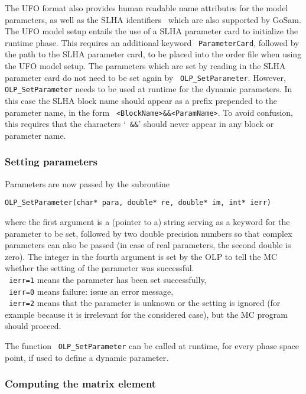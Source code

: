 The UFO  format also provides human readable name attributes for the 
model parameters, as well as the 
SLHA identifiers~\cite{Skands:2003cj} which are also supported by GoSam.
The UFO model setup entails the use of a SLHA parameter card to initialize the runtime phase.
This requires an additional keyword \texttt{ ParameterCard}, followed by the path to the SLHA parameter card,
to be placed into the order file when using the UFO model setup. 
The parameters which are set by reading in the SLHA parameter card do not need to be set 
again by \texttt{ OLP\_SetParameter}. However, \texttt{ OLP\_SetParameter} needs to be used at 
runtime for the dynamic parameters. 
In this case the SLHA block name should appear as a prefix prepended to the parameter name, 
in the form  
\texttt{ <BlockName>\&\&<ParamName>}.
To avoid confusion, this requires that the characters `\texttt{ \&\&}' should never appear in 
any block or parameter name.

\subsubsection{Setting parameters}
Parameters are now passed by the subroutine 
\begin{lstlisting}[style=C]
      OLP_SetParameter(char* para, double* re, double* im, int* ierr)
\end{lstlisting}

where the first argument is a (pointer to a) string serving as a keyword 
for the parameter to be set, followed by two double precision numbers
so that complex parameters can also be passed (in case of real parameters, 
the second double is zero). The integer in the fourth argument 
is set by the OLP to tell the MC whether the setting of the parameter 
was successful.\\
\texttt{ ierr=1} means the parameter has been set successfully, \\
\texttt{ ierr=0} means failure: issue an error message, \\
\texttt{ ierr=2} means that the parameter is unknown 
or the setting is ignored (for example because it is irrelevant 
for the considered case), but the MC program should proceed.


The function \texttt{ OLP\_SetParameter} can be called at runtime, 
for every phase space point, 
if used to define a dynamic parameter. 

\subsubsection{Computing the matrix element}


